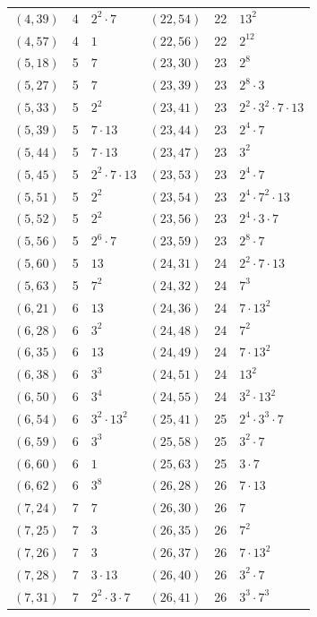 \documentclass[11pt]{article}
\begin{document}
\begin{longtable}{@{}lrl@{\qquad}lrl@{}}
$(4,39)$ & 4 & $2^{2}\cdot 7$ & $(22,54)$ & 22 & $13^{2}$\\
$(4,57)$ & 4 & $1$ & $(22,56)$ & 22 & $2^{12}$\\
$(5,18)$ & 5 & $7$ & $(23,30)$ & 23 & $2^{8}$\\
$(5,27)$ & 5 & $7$ & $(23,39)$ & 23 & $2^{8}\cdot 3$\\
$(5,33)$ & 5 & $2^{2}$ & $(23,41)$ & 23 & $2^{2}\cdot 3^{2}\cdot 7\cdot 13$\\
$(5,39)$ & 5 & $7\cdot 13$ & $(23,44)$ & 23 & $2^{4}\cdot 7$\\
$(5,44)$ & 5 & $7\cdot 13$ & $(23,47)$ & 23 & $3^{2}$\\
$(5,45)$ & 5 & $2^{2}\cdot 7\cdot 13$ & $(23,53)$ & 23 & $2^{4}\cdot 7$\\
$(5,51)$ & 5 & $2^{2}$ & $(23,54)$ & 23 & $2^{4}\cdot 7^{2}\cdot 13$\\
$(5,52)$ & 5 & $2^{2}$ & $(23,56)$ & 23 & $2^{4}\cdot 3\cdot 7$\\
$(5,56)$ & 5 & $2^{6}\cdot 7$ & $(23,59)$ & 23 & $2^{8}\cdot 7$\\
$(5,60)$ & 5 & $13$ & $(24,31)$ & 24 & $2^{2}\cdot 7\cdot 13$\\
$(5,63)$ & 5 & $7^{2}$ & $(24,32)$ & 24 & $7^{3}$\\
$(6,21)$ & 6 & $13$ & $(24,36)$ & 24 & $7\cdot 13^{2}$\\
$(6,28)$ & 6 & $3^{2}$ & $(24,48)$ & 24 & $7^{2}$\\
$(6,35)$ & 6 & $13$ & $(24,49)$ & 24 & $7\cdot 13^{2}$\\
$(6,38)$ & 6 & $3^{3}$ & $(24,51)$ & 24 & $13^{2}$\\
$(6,50)$ & 6 & $3^{4}$ & $(24,55)$ & 24 & $3^{2}\cdot 13^{2}$\\
$(6,54)$ & 6 & $3^{2}\cdot 13^{2}$ & $(25,41)$ & 25 & $2^{4}\cdot 3^{3}\cdot 7$\\
$(6,59)$ & 6 & $3^{3}$ & $(25,58)$ & 25 & $3^{2}\cdot 7$\\
$(6,60)$ & 6 & $1$ & $(25,63)$ & 25 & $3\cdot 7$\\
$(6,62)$ & 6 & $3^{8}$ & $(26,28)$ & 26 & $7\cdot 13$\\
$(7,24)$ & 7 & $7$ & $(26,30)$ & 26 & $7$\\
$(7,25)$ & 7 & $3$ & $(26,35)$ & 26 & $7^{2}$\\
$(7,26)$ & 7 & $3$ & $(26,37)$ & 26 & $7\cdot 13^{2}$\\
$(7,28)$ & 7 & $3\cdot 13$ & $(26,40)$ & 26 & $3^{2}\cdot 7$\\
$(7,31)$ & 7 & $2^{2}\cdot 3\cdot 7$ & $(26,41)$ & 26 & $3^{3}\cdot 7^{3}$\\

\end{longtable}
\end{document}
